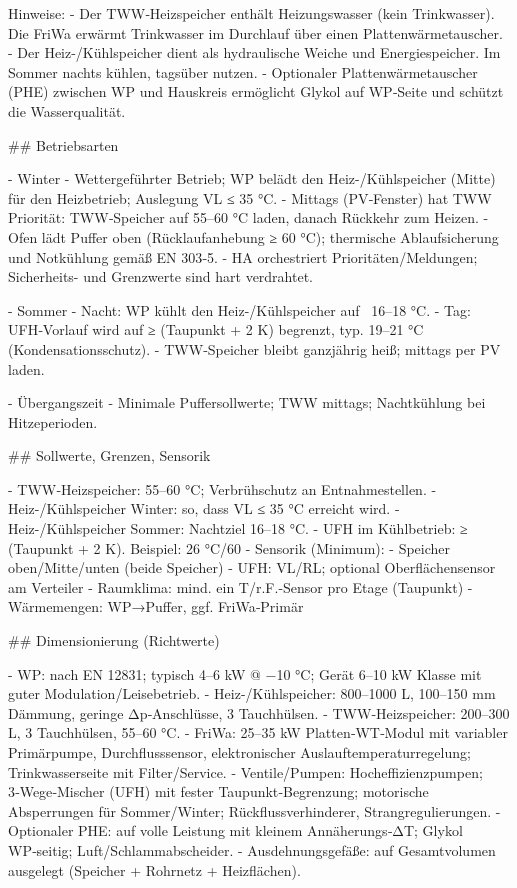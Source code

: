 \documentclass[11pt,oneside]{report}
\begin{document}
\begin{markdown}

Hinweise:
- Der TWW‑Heizspeicher enthält Heizungswasser (kein Trinkwasser). Die FriWa erwärmt Trinkwasser im Durchlauf über einen Plattenwärmetauscher.
- Der Heiz-/Kühlspeicher dient als hydraulische Weiche und Energiespeicher. Im Sommer nachts kühlen, tagsüber nutzen.
- Optionaler Plattenwärmetauscher (PHE) zwischen WP und Hauskreis ermöglicht Glykol auf WP‑Seite und schützt die Wasserqualität.

## Betriebsarten

- Winter
  - Wettergeführter Betrieb; WP belädt den Heiz-/Kühlspeicher (Mitte) für den Heizbetrieb; Auslegung VL ≤ 35 °C.
  - Mittags (PV‑Fenster) hat TWW Priorität: TWW‑Speicher auf 55–60 °C laden, danach Rückkehr zum Heizen.
  - Ofen lädt Puffer oben (Rücklaufanhebung ≥ 60 °C); thermische Ablaufsicherung und Notkühlung gemäß EN 303‑5.
  - HA orchestriert Prioritäten/Meldungen; Sicherheits- und Grenzwerte sind hart verdrahtet.

- Sommer
  - Nacht: WP kühlt den Heiz-/Kühlspeicher auf ~16–18 °C.
  - Tag: UFH‑Vorlauf wird auf ≥ (Taupunkt + 2 K) begrenzt, typ. 19–21 °C (Kondensationsschutz).
  - TWW‑Speicher bleibt ganzjährig heiß; mittags per PV laden.

- Übergangszeit
  - Minimale Puffersollwerte; TWW mittags; Nachtkühlung bei Hitzeperioden.

## Sollwerte, Grenzen, Sensorik

- TWW‑Heizspeicher: 55–60 °C; Verbrühschutz an Entnahmestellen.
- Heiz-/Kühlspeicher Winter: so, dass VL ≤ 35 °C erreicht wird.
- Heiz-/Kühlspeicher Sommer: Nachtziel 16–18 °C.
- UFH im Kühlbetrieb: ≥ (Taupunkt + 2 K). Beispiel: 26 °C/60 %
- Sensorik (Minimum):
  - Speicher oben/Mitte/unten (beide Speicher)
  - UFH: VL/RL; optional Oberflächensensor am Verteiler
  - Raumklima: mind. ein T/r.F.-Sensor pro Etage (Taupunkt)
  - Wärmemengen: WP→Puffer, ggf. FriWa‑Primär

## Dimensionierung (Richtwerte)

- WP: nach EN 12831; typisch 4–6 kW @ −10 °C; Gerät 6–10 kW Klasse mit guter Modulation/Leisebetrieb.
- Heiz-/Kühlspeicher: 800–1000 L, 100–150 mm Dämmung, geringe Δp‑Anschlüsse, 3 Tauchhülsen.
- TWW‑Heizspeicher: 200–300 L, 3 Tauchhülsen, 55–60 °C.
- FriWa: 25–35 kW Platten‑WT‑Modul mit variabler Primärpumpe, Durchflusssensor, elektronischer Auslauftemperaturregelung; Trinkwasserseite mit Filter/Service.
- Ventile/Pumpen: Hocheffizienzpumpen; 3‑Wege‑Mischer (UFH) mit fester Taupunkt‑Begrenzung; motorische Absperrungen für Sommer/Winter; Rückflussverhinderer, Strangregulierungen.
- Optionaler PHE: auf volle Leistung mit kleinem Annäherungs‑ΔT; Glykol WP‑seitig; Luft/Schlammabscheider.
- Ausdehnungsgefäße: auf Gesamtvolumen ausgelegt (Speicher + Rohrnetz + Heizflächen).


\end{markdown}
\end{document}
